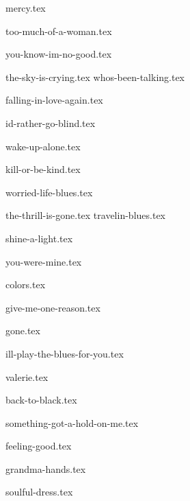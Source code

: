 \begin{songs}{}

  {mercy.tex}
  \sclearpage

  {too-much-of-a-woman.tex}
  \sclearpage

  {you-know-im-no-good.tex}
  \sclearpage

  {the-sky-is-crying.tex}
  {whos-been-talking.tex}

  \sclearpage

  {falling-in-love-again.tex}  
  \sclearpage

  {id-rather-go-blind.tex}  
  \sclearpage
  
  {wake-up-alone.tex}
  \sclearpage
  
  {kill-or-be-kind.tex}
  \sclearpage
  
  {worried-life-blues.tex}
  \sclearpage

  {the-thrill-is-gone.tex}
  {travelin-blues.tex}

  \sclearpage

  {shine-a-light.tex}  
  \sclearpage

  {you-were-mine.tex}
  \sclearpage

  {colors.tex}
  \sclearpage

  {give-me-one-reason.tex}
  \sclearpage

  {gone.tex}
  \sclearpage

  {ill-play-the-blues-for-you.tex}
  \sclearpage
    
  {valerie.tex}
  \sclearpage

  {back-to-black.tex}
  \sclearpage
  
  {something-got-a-hold-on-me.tex}
  \sclearpage

  {feeling-good.tex}
  \sclearpage
    
  {grandma-hands.tex}
  \sclearpage
    
  {soulful-dress.tex}
  \sclearpage
    

\end{songs}
